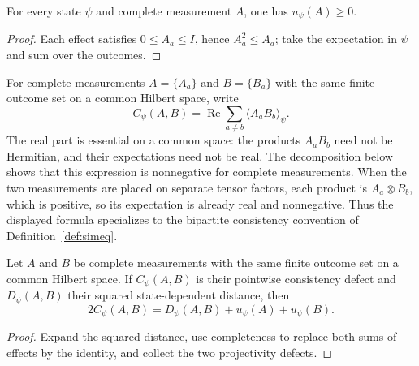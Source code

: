 \begin{lemma}
\label{lem:complete-measurement-projectivity-defect-nonnegative}
	\leanok
	For every state $\psi$ and complete measurement $A$, one has
	$u_\psi(A)\ge0$.
\end{lemma}
\begin{proof}
	\leanok
	Each effect satisfies $0\le A_a\le I$, hence $A_a^2\le A_a$; take the
	expectation in $\psi$ and sum over the outcomes.
\end{proof}

For complete measurements $A=\{A_a\}$ and $B=\{B_a\}$ with the same finite
outcome set on a common Hilbert space, write
\[
	C_\psi(A,B)=\operatorname{Re}\sum_{a\ne b}\langle A_aB_b\rangle_\psi.
\]
The real part is essential on a common space: the products $A_aB_b$ need not
be Hermitian, and their expectations need not be real.  The decomposition below
shows that this expression is nonnegative for complete measurements.  When the
two measurements are placed on separate tensor factors, each product is
$A_a\otimes B_b$, which is positive, so its expectation is already real and
nonnegative.  Thus the displayed formula specializes to the bipartite
consistency convention of Definition~\ref{def:simeq}.

\begin{lemma}
\label{lem:complete-measurement-consistency-distance-decomposition}
	\leanok
	Let $A$ and $B$ be complete measurements with the same finite outcome set on
	a common Hilbert space.  If $C_\psi(A,B)$ is their pointwise consistency
	defect and $D_\psi(A,B)$ their squared state-dependent distance, then
	\[
		2C_\psi(A,B)=D_\psi(A,B)+u_\psi(A)+u_\psi(B).
	\]
\end{lemma}
\begin{proof}
	\leanok
	Expand the squared distance, use completeness to replace both sums of
	effects by the identity, and collect the two projectivity defects.
\end{proof}

